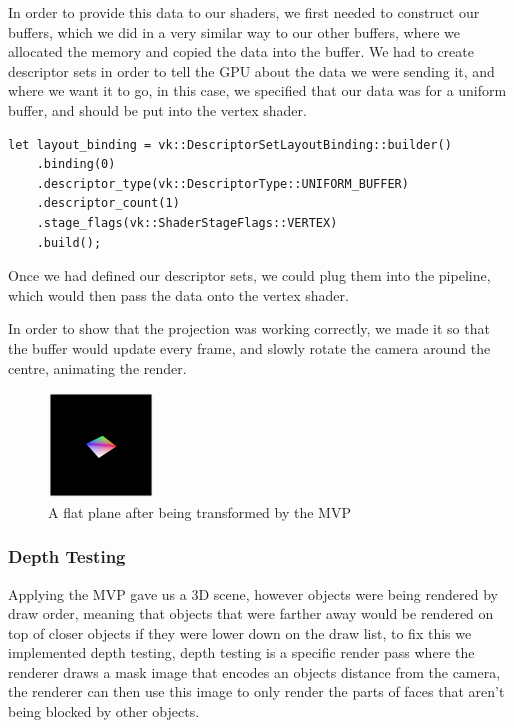 \documentclass[../report.tex]{subfiles}
\begin{document}
In order to provide this data to our shaders, we first needed to construct our buffers, which we did in a very similar way to our other buffers, where we allocated the memory and copied the data into the buffer.
We had to create descriptor sets in order to tell the GPU about the data we were sending it, and where we want it to go, in this case, we specified that our data was for a uniform buffer, and should be put into the vertex shader.

\begin{verbatim}
let layout_binding = vk::DescriptorSetLayoutBinding::builder()
    .binding(0)
    .descriptor_type(vk::DescriptorType::UNIFORM_BUFFER)
    .descriptor_count(1)
    .stage_flags(vk::ShaderStageFlags::VERTEX)
    .build();
\end{verbatim}

Once we had defined our descriptor sets, we could plug them into the pipeline, which would then pass the data onto the vertex shader.

In order to show that the projection was working correctly, we made it so that the buffer would update every frame, and slowly rotate the camera around the centre, animating the render.

\begin{figure}[h]
    \centering
    \includegraphics[width=0.25\textwidth]{images/3d.png}
    \caption{A flat plane after being transformed by the MVP}
\end{figure}

\subsubsection{Depth Testing}
Applying the MVP gave us a 3D scene, however objects were being rendered by draw order, meaning that objects that were farther away would be rendered on top of closer objects if they were lower down on the draw list, to fix this we implemented depth testing, depth testing is a specific render pass where the renderer draws a mask image that encodes an objects distance from the camera, the renderer can then use this image to only render the parts of faces that aren't being blocked by other objects.
\end{document}
